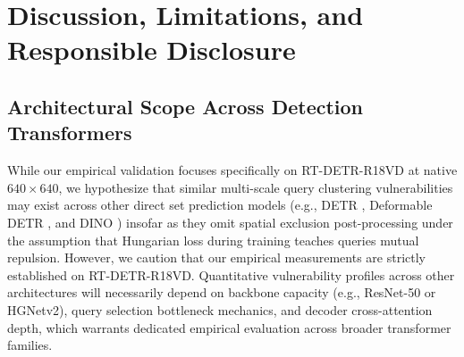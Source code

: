 \documentclass[preprint,12pt]{elsarticle}
\begin{document}
\section{Discussion, Limitations, and Responsible Disclosure}
\label{sec:discussion}

\subsection{Architectural Scope Across Detection Transformers}
While our empirical validation focuses specifically on RT-DETR-R18VD at native $640\times 640$, we hypothesize that similar multi-scale query clustering vulnerabilities may exist across other direct set prediction models (e.g., DETR \citep{carion2020end}, Deformable DETR \citep{zhu2020deformable}, and DINO \citep{zhang2022dino}) insofar as they omit spatial exclusion post-processing under the assumption that Hungarian loss during training teaches queries mutual repulsion. However, we caution that our empirical measurements are strictly established on RT-DETR-R18VD. Quantitative vulnerability profiles across other architectures will necessarily depend on backbone capacity (e.g., ResNet-50 or HGNetv2), query selection bottleneck mechanics, and decoder cross-attention depth, which warrants dedicated empirical evaluation across broader transformer families.
\end{document}
